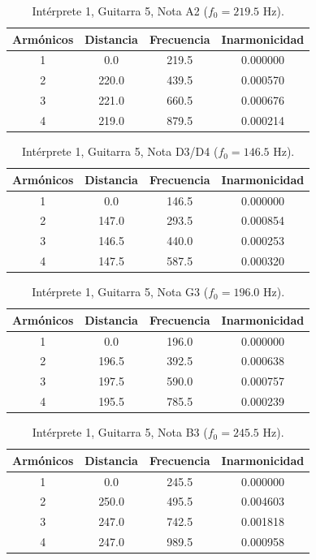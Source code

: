 \begin{table}[htbp]
  \centering
 \small
  \caption{Intérprete 1, Guitarra 5, Nota A2 ($f_0 = 219.5$ Hz).}
  \label{tab:interprete1_g5_a2}
  \begin{tabular}{cccc}
  \toprule
  Armónicos & Distancia & Frecuencia & Inarmonicidad \\
  \midrule
  1 & 0.0 & 219.5 & 0.000000 \\
  2 & 220.0 & 439.5 & 0.000570 \\
  3 & 221.0 & 660.5 & 0.000676 \\
  4 & 219.0 & 879.5 & 0.000214 \\
  \bottomrule
  \end{tabular}
\end{table}

\begin{table}[htbp]
  \centering
 \small
  \caption{Intérprete 1, Guitarra 5, Nota D3/D4 ($f_0 = 146.5$ Hz).}
  \label{tab:interprete1_g5_d3_d4}
  \begin{tabular}{cccc}
  \toprule
  Armónicos & Distancia & Frecuencia & Inarmonicidad \\
  \midrule
  1 & 0.0 & 146.5 & 0.000000 \\
  2 & 147.0 & 293.5 & 0.000854 \\
  3 & 146.5 & 440.0 & 0.000253 \\
  4 & 147.5 & 587.5 & 0.000320 \\
  \bottomrule
  \end{tabular}
\end{table}

\begin{table}[htbp]
  \centering
 \small
  \caption{Intérprete 1, Guitarra 5, Nota G3 ($f_0 = 196.0$ Hz).}
  \label{tab:interprete1_g5_g3}
  \begin{tabular}{cccc}
  \toprule
  Armónicos & Distancia & Frecuencia & Inarmonicidad \\
  \midrule
  1 & 0.0 & 196.0 & 0.000000 \\
  2 & 196.5 & 392.5 & 0.000638 \\
  3 & 197.5 & 590.0 & 0.000757 \\
  4 & 195.5 & 785.5 & 0.000239 \\
  \bottomrule
  \end{tabular}
\end{table}

\begin{table}[htbp]
  \centering
 \small
  \caption{Intérprete 1, Guitarra 5, Nota B3 ($f_0 = 245.5$ Hz).}
  \label{tab:interprete1_g5_b3}
  \begin{tabular}{cccc}
  \toprule
  Armónicos & Distancia & Frecuencia & Inarmonicidad \\
  \midrule
  1 & 0.0 & 245.5 & 0.000000 \\
  2 & 250.0 & 495.5 & 0.004603 \\
  3 & 247.0 & 742.5 & 0.001818 \\
  4 & 247.0 & 989.5 & 0.000958 \\
  \bottomrule
  \end{tabular}
\end{table}

